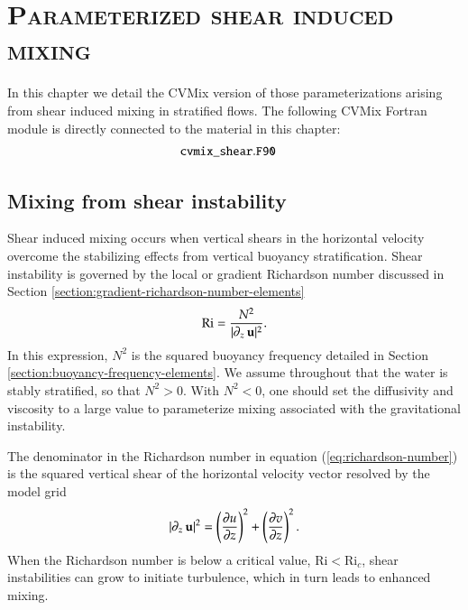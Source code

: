 \chapter{\scshape Parameterized shear induced mixing}
\label{chapter:cvmix_shear}

\minitoc
\vspace{.5cm}

\begin{mdframed}[backgroundcolor=lightgray!50]
  In this chapter we detail the CVMix version of those
  parameterizations arising from shear induced mixing in stratified
  flows.  The following CVMix Fortran module is directly connected to
  the material in this chapter:
\begin{align*} 
 &{\tt cvmix\_shear.F90}
\end{align*}
\end{mdframed}

\section{Mixing from shear instability}
\label{section:shear-instability-mixing}

Shear induced mixing occurs when vertical shears in the horizontal
velocity overcome the stabilizing effects from vertical buoyancy
stratification.  Shear instability is governed by the local or
gradient Richardson number discussed in Section
\ref{section:gradient-richardson-number-elements}
\begin{equation}
 \mbox{Ri} = \frac{N^{2}}{|\partial_{z} \, {\bf u}|^{2} }.
\label{eq:richardson-number}
\end{equation}
In this expression, $N^{2}$ is the squared buoyancy frequency detailed
in Section \ref{section:buoyancy-frequency-elements}.  We assume
throughout that the water is stably stratified, so that $N^{2} > 0$.
With $N^{2} < 0$, one should set the diffusivity and viscosity to a
large value to parameterize mixing associated with the gravitational
instability.

The denominator in the Richardson number in equation
(\ref{eq:richardson-number}) is the squared vertical shear of the
horizontal velocity vector resolved by the model grid
\begin{equation}
 |\partial_{z} \, {\bf u}|^{2}  =
  \left( \frac{\partial u}{\partial z} \right)^{2} 
 +
 \left( \frac{\partial v}{\partial z} \right)^{2}. 
\end{equation}
When the Richardson number is below a critical value, $\mbox{Ri} <
\mbox{Ri}_{c}$, shear instabilities can grow to initiate turbulence,
which in turn leads to enhanced mixing.

